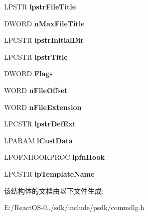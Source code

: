 \begin{DoxyCompactItemize}
\mbox{\label{structtag_o_f_n_a_a52d5f4ec0952a6ae905c55a8a697eab1}} 
L\+P\+S\+TR {\bfseries lpstr\+File\+Title}
\item 
\mbox{\label{structtag_o_f_n_a_abfc650d8527ce398e518f57896906ba4}} 
D\+W\+O\+RD {\bfseries n\+Max\+File\+Title}
\item 
\mbox{\label{structtag_o_f_n_a_acd8c8e6b6a835a3e1203b0dc7a64a166}} 
L\+P\+C\+S\+TR {\bfseries lpstr\+Initial\+Dir}
\item 
\mbox{\label{structtag_o_f_n_a_a93f55584fe8f3d13c4b12b4de652e243}} 
L\+P\+C\+S\+TR {\bfseries lpstr\+Title}
\item 
\mbox{\label{structtag_o_f_n_a_ac4cb27e4f528cc674563f316fbf91cc5}} 
D\+W\+O\+RD {\bfseries Flags}
\item 
\mbox{\label{structtag_o_f_n_a_ac66bda3f397571528e7c130f8a0b0d83}} 
W\+O\+RD {\bfseries n\+File\+Offset}
\item 
\mbox{\label{structtag_o_f_n_a_aaea90346c23cb20d66d74da08cc490fa}} 
W\+O\+RD {\bfseries n\+File\+Extension}
\item 
\mbox{\label{structtag_o_f_n_a_a11e25314227e87475f1ebd7db33e62ea}} 
L\+P\+C\+S\+TR {\bfseries lpstr\+Def\+Ext}
\item 
\mbox{\label{structtag_o_f_n_a_a09e7829e54a8c44a507a8942a5621c43}} 
L\+P\+A\+R\+AM {\bfseries l\+Cust\+Data}
\item 
\mbox{\label{structtag_o_f_n_a_acddf1b63cd40ad6e20832cf47561fd81}} 
L\+P\+O\+F\+N\+H\+O\+O\+K\+P\+R\+OC {\bfseries lpfn\+Hook}
\item 
\mbox{\label{structtag_o_f_n_a_a57ddd81e0a40fd68f217654d659b2e7a}} 
L\+P\+C\+S\+TR {\bfseries lp\+Template\+Name}
\end{DoxyCompactItemize}


该结构体的文档由以下文件生成\+:\begin{DoxyCompactItemize}
\item 
E\+:/\+React\+O\+S-\/0../sdk/include/psdk/commdlg.\+h\end{DoxyCompactItemize}
